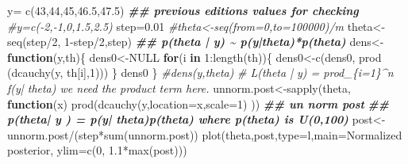 \documentclass[
]{book}
\newenvironment{Shaded}{\begin{snugshade}}{\end{snugshade}}
\newcommand{\AttributeTok}[1]{\textcolor[rgb]{0.77,0.63,0.00}{#1}}
\newcommand{\CommentTok}[1]{\textcolor[rgb]{0.56,0.35,0.01}{\textit{#1}}}
\newcommand{\ConstantTok}[1]{\textcolor[rgb]{0.00,0.00,0.00}{#1}}
\newcommand{\ControlFlowTok}[1]{\textcolor[rgb]{0.13,0.29,0.53}{\textbf{#1}}}
\newcommand{\DecValTok}[1]{\textcolor[rgb]{0.00,0.00,0.81}{#1}}
\newcommand{\DocumentationTok}[1]{\textcolor[rgb]{0.56,0.35,0.01}{\textbf{\textit{#1}}}}
\newcommand{\FloatTok}[1]{\textcolor[rgb]{0.00,0.00,0.81}{#1}}
\newcommand{\FunctionTok}[1]{\textcolor[rgb]{0.00,0.00,0.00}{#1}}
\newcommand{\NormalTok}[1]{#1}
\newcommand{\OtherTok}[1]{\textcolor[rgb]{0.56,0.35,0.01}{#1}}
\newcommand{\SpecialCharTok}[1]{\textcolor[rgb]{0.00,0.00,0.00}{#1}}
\newcommand{\StringTok}[1]{\textcolor[rgb]{0.31,0.60,0.02}{#1}}
\theoremstyle{definition}
\theoremstyle{definition}
\theoremstyle{definition}
\theoremstyle{definition}
\theoremstyle{remark}
\begin{document}
\begin{Shaded}
\begin{Highlighting}[]
\NormalTok{ y}\OtherTok{=} \FunctionTok{c}\NormalTok{(}\DecValTok{43}\NormalTok{,}\DecValTok{44}\NormalTok{,}\DecValTok{45}\NormalTok{,}\FloatTok{46.5}\NormalTok{,}\FloatTok{47.5}\NormalTok{)}
\DocumentationTok{\#\# previous editions values for checking}
 \CommentTok{\#y=c({-}2,{-}1,0,1.5,2.5)}
\NormalTok{  step}\OtherTok{=}\FloatTok{0.01}
\CommentTok{\#theta\textless{}{-}seq(from=0,to=100000)/m}
\NormalTok{ theta}\OtherTok{\textless{}{-}}\FunctionTok{seq}\NormalTok{(step}\SpecialCharTok{/}\DecValTok{2}\NormalTok{, }\DecValTok{1}\SpecialCharTok{{-}}\NormalTok{step}\SpecialCharTok{/}\DecValTok{2}\NormalTok{,step)}
 \DocumentationTok{\#\# p(theta | y) \textasciitilde{} p(y|theta)*p(theta)}
\NormalTok{ dens}\OtherTok{\textless{}{-}}\ControlFlowTok{function}\NormalTok{(y,th)\{}
\NormalTok{   dens0}\OtherTok{\textless{}{-}}\ConstantTok{NULL}
   \ControlFlowTok{for}\NormalTok{(i }\ControlFlowTok{in} \DecValTok{1}\SpecialCharTok{:}\FunctionTok{length}\NormalTok{(th))\{}
\NormalTok{     dens0}\OtherTok{\textless{}{-}}\FunctionTok{c}\NormalTok{(dens0, }\FunctionTok{prod}\NormalTok{ (}\FunctionTok{dcauchy}\NormalTok{(y, th[i],}\DecValTok{1}\NormalTok{)))}
\NormalTok{   \}}
\NormalTok{   dens0}
\NormalTok{ \}}
 \CommentTok{\#dens(y,theta)}
  \CommentTok{\# L(theta | y) = prod\_\{i=1\}\^{}n  f(y| theta)  we need the product term here.}
\NormalTok{ unnorm.post}\OtherTok{\textless{}{-}}\FunctionTok{sapply}\NormalTok{(theta, }\ControlFlowTok{function}\NormalTok{(x)  }\FunctionTok{prod}\NormalTok{(}\FunctionTok{dcauchy}\NormalTok{(y,}\AttributeTok{location=}\NormalTok{x,}\AttributeTok{scale=}\DecValTok{1}\NormalTok{) )) }\DocumentationTok{\#\# un norm post}
   \DocumentationTok{\#\# p(theta| y ) = p(y| theta)p(theta)  where p(theta) is U(0,100)}
\NormalTok{ post}\OtherTok{\textless{}{-}}\NormalTok{unnorm.post}\SpecialCharTok{/}\NormalTok{(step}\SpecialCharTok{*}\FunctionTok{sum}\NormalTok{(unnorm.post))}
 \FunctionTok{plot}\NormalTok{(theta,post,}\AttributeTok{type=}\StringTok{\textquotesingle{}l\textquotesingle{}}\NormalTok{,}\AttributeTok{main=}\StringTok{\textquotesingle{}Normalized posterior\textquotesingle{}}\NormalTok{, }\AttributeTok{ylim=}\FunctionTok{c}\NormalTok{(}\DecValTok{0}\NormalTok{, }\FloatTok{1.1}\SpecialCharTok{*}\FunctionTok{max}\NormalTok{(post)))}
\end{Highlighting}
\end{Shaded}
\end{document}
